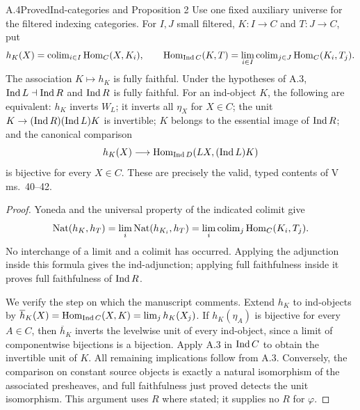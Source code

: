 \begin{claim}{A.4}{Proved}{Ind-categories and Proposition 2}
Use one fixed auxiliary universe for the filtered indexing categories. For $I,J$ small filtered, $K:I\to C$ and $T:J\to C$, put
\[
 h_K(X)=\operatorname{colim}_{i\in I}\operatorname{Hom}_C(X,K_i),\qquad
 \operatorname{Hom}_{\operatorname{Ind} C}(K,T)=\lim_{i\in I}\operatorname{colim}_{j\in J}\operatorname{Hom}_C(K_i,T_j).
\]
The association $K\mapsto h_K$ is fully faithful. Under the hypotheses of A.3, $\operatorname{Ind} L\dashv\operatorname{Ind} R$ and $\operatorname{Ind} R$ is fully faithful. For an ind-object $K$, the following are equivalent: $h_K$ inverts $W_L$; it inverts all $\eta_X$ for $X\in C$; the unit $K\to(\operatorname{Ind} R)(\operatorname{Ind} L)K$ is invertible; $K$ belongs to the essential image of $\operatorname{Ind} R$; and the canonical comparison
\[
 h_K(X)\longrightarrow
 \operatorname{Hom}_{\operatorname{Ind} D}(LX,(\operatorname{Ind} L)K)
\]
is bijective for every $X\in C$. These are precisely the valid, typed contents of V ms.~40--42.
\end{claim}
\begin{proof}
Yoneda and the universal property of the indicated colimit give
\[
 \operatorname{Nat}(h_K,h_T)
 =\lim_i\operatorname{Nat}(h_{K_i},h_T)
 =\lim_i\operatorname{colim}_j\operatorname{Hom}_C(K_i,T_j).
\]
No interchange of a limit and a colimit has occurred. Applying the adjunction inside this formula gives the ind-adjunction; applying full faithfulness inside it proves full faithfulness of $\operatorname{Ind} R$.

We verify the step on which the manuscript comments. Extend $h_K$ to ind-objects by $\overline h_K(X)=\operatorname{Hom}_{\operatorname{Ind} C}(X,K)=\lim_jh_K(X_j)$. If $h_K(\eta_A)$ is bijective for every $A\in C$, then $\overline h_K$ inverts the levelwise unit of every ind-object, since a limit of componentwise bijections is a bijection. Apply A.3 in $\operatorname{Ind} C$ to obtain the invertible unit of $K$. All remaining implications follow from A.3. Conversely, the comparison on constant source objects is exactly a natural isomorphism of the associated presheaves, and full faithfulness just proved detects the unit isomorphism. This argument uses $R$ where stated; it supplies no $R$ for $\varphi$.
\end{proof}

